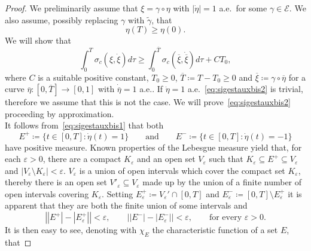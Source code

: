 \documentclass[11pt,a4paper,american]{article}
\newcommand{\Ecal}{\mathcal E}
\newcommand{\ovT}{\overline T}
\newcommand{\oveta}{\overline\eta}
\newcommand{\ovxi}{\overline\xi}
\begin{document}
    \begin{proof}
        We preliminarily assume that $\xi=\gamma\circ\eta$ with $|\dot\eta|=1$ a.e.\ for some $\gamma\in\Ecal$. We also assume, possibly replacing $\gamma$ with $\widetilde\gamma$, that
        \begin{equation}\label{eq:sigestauxbis1}
            \eta(T)\ge\eta(0).
        \end{equation}
        We will show that
        \begin{equation}\label{eq:sigestauxbis2}
            \int_0^T\sigma_c\left(\xi,\dot\xi\right)d\tau\ge\int_0^{\ovT}\sigma_c\left(\ovxi,\dot\ovxi\right)d\tau+CT_0,
        \end{equation}
        where $C$ is a suitable positive constant, $T_0\ge0$, $\ovT\coloneqq T-T_0\ge0$ and $\ovxi\coloneqq\gamma\circ\oveta$ for a curve $\oveta:\left[0,\ovT\right]\to[0,1]$ with $\dot\oveta=1$ a.e.. If $\dot\eta=1$ a.e.\ \cref{eq:sigestauxbis2} is trivial, therefore we assume that this is not the case. We will prove~\cref{eq:sigestauxbis2} proceeding by approximation.\\
        It follows from~\cref{eq:sigestauxbis1} that both
        \begin{equation*}
            E^+\coloneqq\{t\in[0,T]:\dot\eta(t)=1\}\qquad\text{and}\qquad E^-\coloneqq\{t\in[0,T]:\dot\eta(t)=-1\}
        \end{equation*}
        have positive measure. Known properties of the Lebesgue measure yield that, for each $\varepsilon>0$, there are a compact $K_\varepsilon$ and an open set $V_\varepsilon$ such that $K_\varepsilon\subseteq E^+\subseteq V_\varepsilon$ and $|V_\varepsilon\setminus K_\varepsilon|<\varepsilon$. $V_\varepsilon$ is a union of open intervals which cover the compact set $K_\varepsilon$, thereby there is an open set $V'_\varepsilon\subseteq V_\varepsilon$ made up by the union of a finite number of open intervals covering $K_\varepsilon$. Setting $E^+_\varepsilon\coloneqq V_\varepsilon'\cap[0,T]$ and $E_\varepsilon^-\coloneqq[0,T]\setminus E_\varepsilon^+$ it is apparent that they are both the finite union of some intervals and
        \begin{equation*}
            \left|\left|E^+\right|-\left|E^+_\varepsilon\right|\right|<\varepsilon,\qquad\left|\left|E^-\right|-\left|E^-_\varepsilon\right|\right|<\varepsilon,\qquad\text{for every }\varepsilon>0.
        \end{equation*}
        It is then easy to see, denoting with $\chi_E$ the characteristic function of a set $E$, that

\end{proof}
\end{document}
